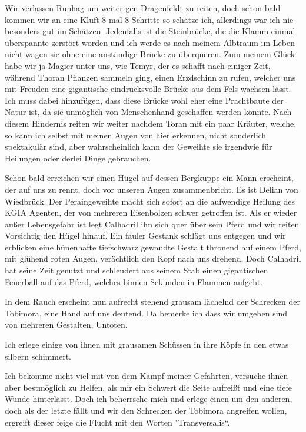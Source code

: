 \documentclass[11pt]{scrreprt}
\begin{document}
Wir verlassen Runhag um weiter gen Dragenfeldt  zu reiten, doch schon bald kommen wir an eine Kluft 8 mal 8 Schritte so schätze ich, allerdings war ich nie besonders gut im Schätzen. Jedenfalls ist die Steinbrücke, die die Klamm einmal überspannte zerstört worden und ich werde es nach meinem Albtraum im Leben nicht wagen sie ohne eine anständige Brücke zu überqueren. Zum meinem Glück habe wir ja Magier unter uns, wie Temyr, der es schafft nach einiger Zeit, während Thoran Pflanzen sammeln ging, einen Erzdschinn zu rufen, welcher uns mit Freuden eine gigantische
eindrucksvolle Brücke aus dem Fels wachsen lässt. Ich muss dabei hinzufügen, dass diese Brücke wohl eher eine Prachtbaute der Natur ist, da sie unmöglich von Menschenhand geschaffen werden könnte. Nach diesem Hindernis reiten wir weiter nachdem Toran mit ein paar Kräuter, welche, so kann ich selbst mit meinen Augen von hier erkennen, nicht sonderlich spektakulär sind, aber wahrscheinlich kann der Geweihte sie irgendwie für Heilungen oder derlei Dinge gebrauchen.\par
Schon bald erreichen wir einen Hügel auf dessen Bergkuppe ein Mann erscheint, der auf uns zu rennt, doch vor unseren Augen zusammenbricht. Es ist Delian von Wiedbrück. Der Peraingeweihte macht sich sofort an die aufwendige Heilung des KGIA Agenten, der von mehreren Eisenbolzen schwer getroffen ist. Als er wieder außer Lebensgefahr ist legt Calhadril ihn sich quer über sein Pferd und wir reiten Vorsichtig den Hügel hinauf. Ein fauler Gestank schlägt uns entgegen und wir erblicken eine hünenhafte tiefschwarz gewandte Gestalt thronend auf einem Pferd, mit glühend roten Augen, verächtlich den Kopf nach uns drehend. Doch Calhadril hat seine Zeit genutzt und schleudert aus seinem Stab einen gigantischen Feuerball auf das Pferd, welches binnen Sekunden in Flammen aufgeht.\par
In dem Rauch erscheint nun aufrecht stehend grausam lächelnd der Schrecken der Tobimora, eine Hand auf uns deutend. Da bemerke ich dass wir umgeben sind von mehreren Gestalten, Untoten.\par
Ich erlege einige von ihnen mit grausamen Schüssen in ihre Köpfe in den etwas silbern schimmert.\par
Ich bekomme nicht viel mit von dem Kampf meiner Gefährten, versuche ihnen aber bestmöglich zu Helfen, als mir ein Schwert die Seite aufreißt und eine tiefe Wunde hinterlässt. Doch ich beherrsche mich und erlege einen um den anderen, doch als der letzte fällt und wir den Schrecken der Tobimora angreifen wollen, ergreift dieser feige die Flucht mit den Worten "Transversalis“.\par
\end{document}
